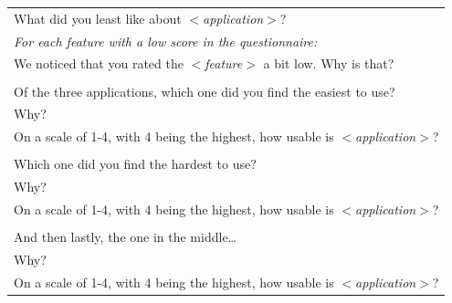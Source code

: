\begin{longtable}{|p{14cm}|}
		  	What did you least like about \textit{$<$application$>$}? \\ 
		  	\textit{For each feature with a low score in the questionnaire:} \\ 
		  	\hspace{6mm}We noticed that you rated the \textit{$<$feature$>$} a bit low. Why is that? \\ 
		  	\\
			Of the three applications, which one did you find the easiest to use? \\ 
			Why? \\ 
			On a scale of 1-4, with 4 being the highest, how usable is \textit{$<$application$>$}? \\ 
			\\
			Which one did you find the hardest to use? \\ 
			Why? \\ 
			On a scale of 1-4, with 4 being the highest, how usable is \textit{$<$application$>$}? \\
			\\
			And then lastly, the one in the middle\ldots \\ 
			Why? \\ 
			On a scale of 1-4, with 4 being the highest, how usable is \textit{$<$application$>$}? \\ \hline
		\end{longtable}

